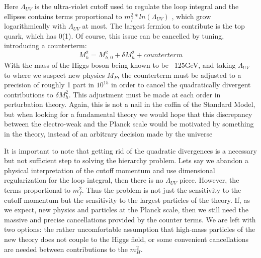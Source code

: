 Here $\Lambda_{UV} $ is the ultra-violet cutoff used to regulate the loop integral and the ellipses contains terms proportional to $m_f^2*ln(\Lambda_{UV})$ , which grow logarithmically with $\Lambda_{UV} $ at most. The largest fermion to contribute is the top quark, which has 0(1). Of course, this issue can be cancelled by tuning, introducing a counterterm:
\begin{equation*}
    M_h^2 = M_{h,0}^2 + \delta M_h^2 + counterterm
\end{equation*}
With the mass of the Higgs boson being known to be ~125GeV, and taking $\Lambda_{UV} $ to where we suspect new physics $M_P$, the counterterm must be adjusted to a precision of roughly 1 part in $10^15$ in order to cancel the quadratically divergent contributions to $\delta M_h^2$. This adjustment must be made at each order in perturbation theory. Again, this is not a nail in the coffin of the Standard Model, but when looking for a fundamental theory we would hope that this discrepancy between the electro-weak and the Planck scale would be motivated by something in the theory, instead of an arbitrary decision made by the universe




It is important to note that getting rid of the quadratic divergences is a necessary but not sufficient step to solving the hierarchy problem. Lets say we abandon a physical interpretation of the cutoff momentum and use dimensional regularization for the loop integral, then there is no $\Lambda_{UV} $ piece. However, the terms proportional to $m_f^2$. Thus the problem is not just the sensitivity to the cutoff momentum but the sensitivity to the largest particles of the theory. If, as we expect, new physics and particles at the Planck scale, then we still need the massive and precise cancellations provided by the counter terms. We are left with two options: the rather uncomfortable assumption that high-mass particles of the new theory does not couple to the Higgs field, or some convenient cancellations are needed between contributions to the $m_H^2$. 

\newline
\newline

